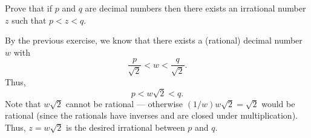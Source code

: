 \documentclass[12 pt, letterpaper]{hmcpset}
\begin{document}
\pagebreak

\begin{problem}[6.]
	Prove that if $p$ and $q$ are decimal numbers then there exists an irrational number $z$ such that $p < z < q$.
\end{problem}

\begin{solution}
	By the previous exercise, we know that there exists a (rational) decimal number $w$ with
	\[
		\frac{p}{\sqrt{2}} < w < \frac{q}{\sqrt{2}}.
	\]
	Thus,
	\[
		p < w  \sqrt{2} < q.
	\]
	Note that $w \sqrt{2}$ cannot be rational --- otherwise $(1 / w) w \sqrt{2} = \sqrt{2}$ would be rational (since the rationals have inverses and are closed under multiplication). Thus, $z = w \sqrt{2}$ is the desired irrational between $p$ and $q$.
\end{solution}
\end{document}
